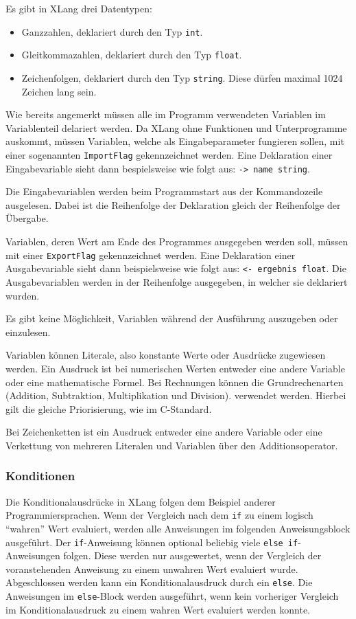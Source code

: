\documentclass[a4paper]{article}
\begin{document}
Es gibt in XLang drei Datentypen:

\begin{itemize}
	\item Ganzzahlen, deklariert durch den Typ \texttt{int}.
	\item Gleitkommazahlen, deklariert durch den Typ \texttt{float}.
	\item Zeichenfolgen, deklariert durch den Typ \texttt{string}. Diese dürfen maximal 1024 Zeichen
		lang sein.
\end{itemize}

Wie bereits angemerkt müssen alle im Programm verwendeten Variablen im Variablenteil delariert
werden.
Da XLang ohne Funktionen und Unterprogramme auskommt, müssen Variablen, welche als Eingabeparameter
fungieren sollen, mit einer sogenannten \texttt{ImportFlag} gekennzeichnet werden. Eine Deklaration
einer Eingabevariable sieht dann bespielsweise wie folgt aus: \texttt{-> name string}.

Die Eingabevariablen werden beim Programmstart aus der Kommandozeile ausgelesen.
Dabei ist die Reihenfolge der Deklaration gleich der Reihenfolge der Übergabe.

Variablen, deren Wert am Ende des Programmes ausgegeben werden soll, müssen mit einer
\texttt{ExportFlag} gekennzeichnet werden. Eine Deklaration einer Ausgabevariable sieht dann
beispielsweise wie folgt aus: \texttt{<- ergebnis float}.
Die Ausgabevariablen werden in der Reihenfolge ausgegeben, in welcher sie deklariert wurden.

Es gibt keine Möglichkeit, Variablen während der Ausführung auszugeben oder einzulesen.

Variablen können Literale, also konstante Werte oder Ausdrücke zugewiesen werden.
Ein Ausdruck ist bei numerischen Werten entweder eine andere Variable oder eine mathematische
Formel. Bei Rechnungen können die Grundrechenarten (Addition, Subtraktion, Multiplikation und
Division). verwendet werden. Hierbei gilt die gleiche Priorisierung, wie im C-Standard.

Bei Zeichenketten ist ein Ausdruck entweder eine andere Variable oder eine Verkettung von mehreren
Literalen und Variablen über den Additionsoperator.

\subsubsection{Konditionen}

Die Konditionalausdrücke in XLang folgen dem Beispiel anderer Programmiersprachen.
Wenn der Vergleich nach dem \texttt{if} zu einem logisch \enquote{wahren} Wert evaluiert, werden
alle Anweisungen im folgenden Anweisungsblock ausgeführt.
Der \texttt{if}-Anweisung können optional beliebig viele \texttt{else if}-Anweisungen folgen.
Diese werden nur ausgewertet, wenn der Vergleich der voranstehenden Anweisung zu einem unwahren Wert
evaluiert wurde.
Abgeschlossen werden kann ein Konditionalausdruck durch ein \texttt{else}. Die Anweisungen im
\texttt{else}-Block werden ausgeführt, wenn kein vorheriger Vergleich im Konditionalausdruck zu
einem wahren Wert evaluiert werden konnte.
\end{document}
